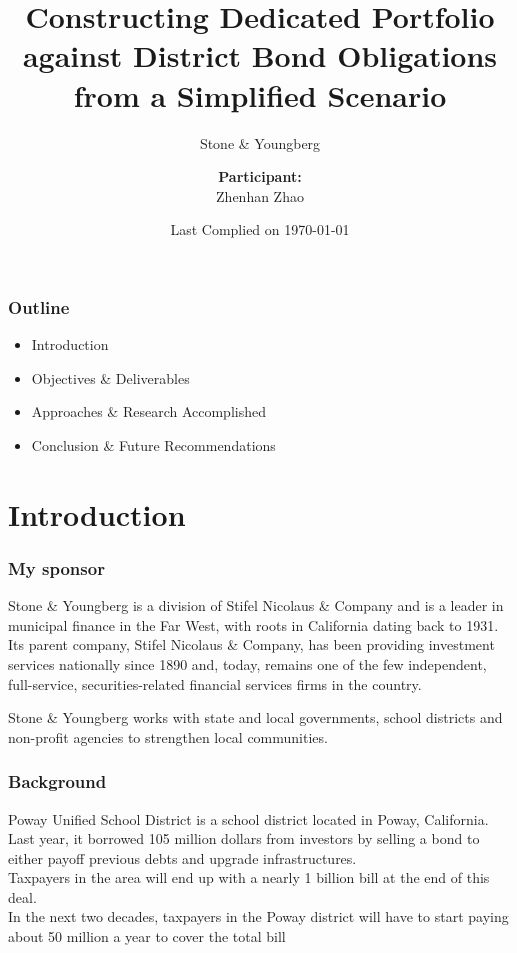\documentclass[compress,handout,10pt]{beamer}
\title{{\color{blue} \LARGE Constructing Dedicated Portfolio against District Bond Obligations from a Simplified Scenario\newline} }
\subtitle{{\color{red} \large Stone \& Youngberg  } }
\author{ 
    {\bf{Participant:}} \\ 
Zhenhan Zhao\\ 
    \vspace{5pt}
}
\institute{JHU AMS 2012 FALL}
\date{\mygreen Last Complied on \today}
\let\olditem\item
\renewcommand{\item}{\setlength{\itemsep}{0.5\baselineskip}\olditem}
\begin{document}
\begin{frame}[plain]
    \titlepage
\end{frame}

\begin{frame}
    \frametitle{Outline}
   \begin{itemize}
    \item Introduction 
    \item Objectives \& Deliverables
    \item Approaches \& Research Accomplished
    \item Conclusion \& Future Recommendations
   \end{itemize}
\end{frame}

\section{Introduction}

\begin{frame}
    \frametitle{My sponsor}
Stone \& Youngberg is a division of Stifel Nicolaus \& Company and is a leader in municipal finance in the Far West, with roots in California dating back to 1931. Its parent company, Stifel Nicolaus \& Company, has been providing investment services nationally since 1890 and, today, remains one of the few independent, full-service, securities-related financial services firms in the country.
\vspace{3mm}

Stone \& Youngberg works with state and local governments, school districts and non-profit agencies to strengthen local communities.  
\end{frame}

\begin{frame}
    \frametitle{Background}
Poway Unified School District is a school district located in Poway, California.\\
\vspace{3mm}
Last year, it borrowed 105 million dollars from investors by selling a bond to either payoff previous debts and upgrade infrastructures.\\
Taxpayers in the area will end up with a nearly 1 billion bill at the end of this deal. \\
\vspace{3mm}
In the next two decades, taxpayers in the Poway district will have to start paying about 50 million a year to cover the total bill
\end{frame}
\end{document}
